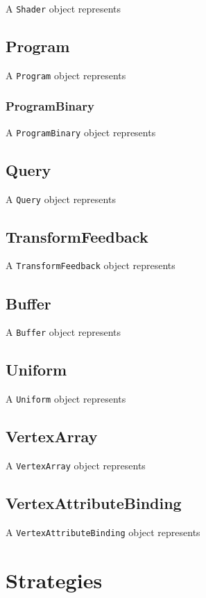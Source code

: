 \documentclass{article}
\begin{document}
A \lstinline|Shader| object represents 

\subsection{Program}

A \lstinline|Program| object represents 

\subsubsection{ProgramBinary}

A \lstinline|ProgramBinary| object represents 

\subsection{Query}

A \lstinline|Query| object represents 

\subsection{TransformFeedback}

A \lstinline|TransformFeedback| object represents 

\subsection{Buffer}

A \lstinline|Buffer| object represents 

\subsection{Uniform}

A \lstinline|Uniform| object represents 

\subsection{VertexArray}

A \lstinline|VertexArray| object represents 

\subsection{VertexAttributeBinding}

A \lstinline|VertexAttributeBinding| object represents 

\section{Strategies}
\end{document}
